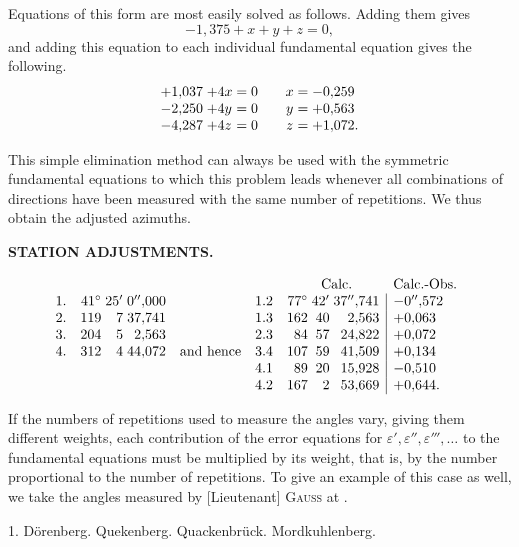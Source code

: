 Equations of this form are most easily solved as follows. Adding them gives
\[
 -1{,}375+x+y+z=0,
\]
and adding this equation to each individual fundamental equation gives the following.
\[
\begin{array}{@{}r@{\;}l@{\;=\;}r@{\qquad}c@{\;=\;}l@{}}
 +1{,}037&+4x&0&x&-0{,}259\\
 -2{,}250&+4y&0&y&+0{,}563\\
 -4{,}287&+4z&0&z&+1{,}072.
\end{array}
\]

This simple elimination method can always be used with the symmetric fundamental equations to which this problem leads whenever all combinations of directions have been measured with the same number of repetitions. We thus obtain the adjusted azimuths.

\par\clearpage
\noindent\null\hfill{\small\textbf{STATION ADJUSTMENTS.}}\hfill{}\par\medskip

\[
\begin{array}{@{}l@{\quad}r@{\;}r@{\;}r@{\quad}l@{\quad}r@{\quad}r@{\;}r@{\;}r|l@{}}
 \multicolumn{6}{c}{}&\multicolumn{3}{c}{\text{Calc.}}&\multicolumn{1}{c}{\text{Calc.-Obs.}}\\
 1.&41^\circ&25'&0''{,}000&&1.2&77^\circ&42'&37''{,}741&-0''{,}572\\
 2.&119&7&37{,}741&&1.3&162&40&2{,}563&+0{,}063\\
 3.&204&5&2{,}563&&2.3&84&57&24{,}822&+0{,}072\\
 4.&312&4&44{,}072&\text{and hence}&3.4&107&59&41{,}509&+0{,}134\\
 &&&&&4.1&89&20&15{,}928&-0{,}510\\
 &&&&&4.2&167&2&53{,}669&+0{,}644.
\end{array}
\]

If the numbers of repetitions used to measure the angles vary, giving them different weights, each contribution of the error equations for \(\varepsilon',\varepsilon'',\varepsilon''',\ldots\) to the fundamental equations must be multiplied by its weight, that is, by the number proportional to the number of repetitions. To give an example of this case as well, we take the angles measured by [Lieutenant] \textsc{Gauss} at .

\begin{center}
 1. Dörenberg. Quekenberg. Quackenbrück. Mordkuhlenberg.
\end{center}

